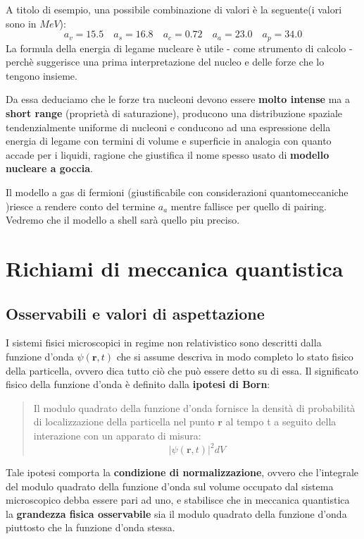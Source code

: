 A titolo di esempio, una possibile combinazione di valori è la seguente(i
valori sono in \(MeV\)):
\[
	a_{v} = 15.5 \quad a_{s} = 16.8 \quad a_{c} = 0.72 \quad a_{a} = 23.0 \quad a_{p} = 34.0
\]
La formula della energia di legame nucleare è utile - come strumento di
calcolo - perchè suggerisce una prima interpretazione del nucleo e delle
forze che lo tengono insieme.

Da essa deduciamo che le forze tra nucleoni devono essere \textbf{molto
	intense} ma a \textbf{short range} (proprietà di saturazione), producono
una distribuzione spaziale tendenzialmente uniforme di nucleoni e
conducono ad una espressione della energia di legame con termini di
volume e superficie in analogia con quanto accade per i liquidi, ragione
che giustifica il nome spesso usato di \textbf{modello nucleare a
	goccia}.

Il modello a gas di fermioni (giustificabile con considerazioni
quantomeccaniche )riesce a rendere conto del termine \(a_{a}\) mentre
fallisce per quello di pairing.
Vedremo che il modello a shell sarà
quello piu preciso.


\section{Richiami di meccanica quantistica}\label{richiami-di-meccanica-quantistica}

\subsection{Osservabili e valori di aspettazione}\label{sec:osservabili-e-valori-di-aspettazione}

I sistemi fisici microscopici in regime non relativistico sono descritti
dalla funzione d'onda \(\psi(\bm{r},t)\) che si assume descriva in modo
completo lo stato fisico della particella, ovvero dica tutto ciò che può
essere detto su di essa.
Il significato fisico della funzione d'onda è
definito dalla \textbf{ipotesi di Born}:
\begin{quote}
	Il modulo quadrato della funzione d'onda fornisce la densità di probabilità
	di localizzazione della particella nel punto \(\bm{r}\) al tempo t a seguito
	della interazione con un apparato di misura:
	\[
		| \psi(\bm{r},t)|^{2}dV
	\]
\end{quote}
Tale ipotesi comporta la \textbf{condizione di normalizzazione},
ovvero che l'integrale del modulo quadrato della funzione d'onda sul
volume occupato dal sistema microscopico debba essere pari ad uno, e
stabilisce che in meccanica quantistica la \textbf{grandezza fisica osservabile}
sia il modulo quadrato della funzione d'onda piuttosto che la funzione d'onda stessa.

